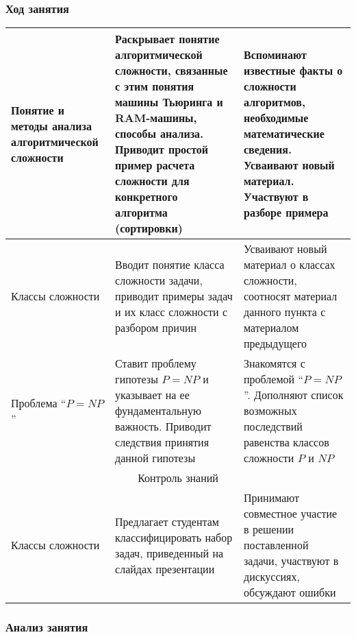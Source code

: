 \documentclass[compress, 9pt]{beamer}
\begin{document}
\begin{refsection}
\begin{frame}
    \end{frame}

    \begin{frame}\frametitle{Ход занятия}\footnotesize

        \begin{tabular}{| p{} | p{} | p{} |}\hline

            {Понятие и методы анализа алгоритмической сложности} &
            {Раскрывает понятие алгоритмической сложности, связанные с этим понятия машины Тьюринга и RAM-машины, способы анализа. Приводит простой пример расчета сложности для конкретного алгоритма (сортировки)} &
            {Вспоминают известные факты о сложности алгоритмов, необходимые математические сведения. Усваивают новый материал. Участвуют в разборе примера} \\ \hline

            {Классы сложности} &
            {Вводит понятие класса сложности задачи, приводит примеры задач и их класс сложности с разбором причин} &
            {Усваивают новый материал о классах сложности, соотносят материал данного пункта с материалом предыдущего} \\ \hline

            {Проблема \enquote{$P = NP$}} &
            {Ставит проблему гипотезы $P = NP$ и указывает на ее фундаментальную важность. Приводит следствия принятия данной гипотезы} &
            {Знакомятся с проблемой \enquote{$P = NP$}. Дополняют список возможных последствий равенства классов сложности $P$ и $NP$} \\ \hline

            \multicolumn{3}{|c|}{Контроль знаний} \\ \hline

            {Классы сложности} &
            {Предлагает студентам классифицировать набор задач, приведенный на слайдах презентации} &
            {Принимают совместное участие в решении поставленной задачи, участвуют в дискуссиях, обсуждают ошибки} \\ \hline
        \end{tabular}

    \end{frame}

    \begin{frame}\frametitle{Анализ занятия}


\end{frame}
\end{refsection}
\end{document}

